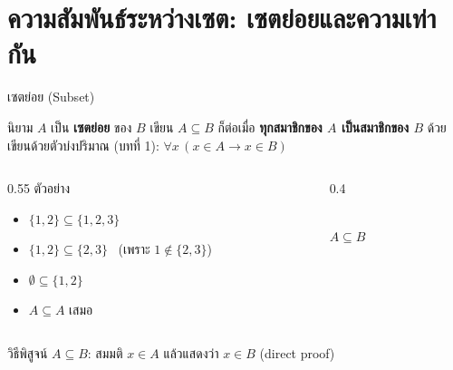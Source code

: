 \section{ความสัมพันธ์ระหว่างเซต: เซตย่อยและความเท่ากัน}

\begin{frame}{เซตย่อย (Subset)}
  \begin{block}{นิยาม}
    $A$ เป็น \textbf{เซตย่อย} ของ $B$ เขียน $A \subseteq B$ ก็ต่อเมื่อ
    \textbf{ทุกสมาชิกของ $A$ เป็นสมาชิกของ $B$} ด้วย \\
    เขียนด้วยตัวบ่งปริมาณ (บทที่ 1): $\forall x\, (x \in A \rightarrow x \in B)$
  \end{block}
  \begin{columns}[T]
    \begin{column}{0.55\textwidth}
      ตัวอย่าง
      \begin{itemize}\small
        \item $\{1, 2\} \subseteq \{1, 2, 3\}$ \hfill \TT
        \item $\{1, 2\} \subseteq \{2, 3\}$ \hfill \FF\ \footnotesize(เพราะ $1 \notin \{2,3\}$)
        \item $\emptyset \subseteq \{1, 2\}$ \hfill \TT
        \item $A \subseteq A$ เสมอ \hfill \TT
      \end{itemize}
    \end{column}
    \begin{column}{0.4\textwidth}
      \begin{center}
      \\
      $A \subseteq B$
      \end{center}
    \end{column}
  \end{columns}
  \vspace{0.2em}
  \footnotesize วิธีพิสูจน์ $A \subseteq B$: สมมติ $x \in A$ แล้วแสดงว่า $x \in B$ (direct proof)
\end{frame}

